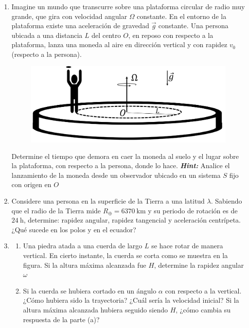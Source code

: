 \documentclass[letterpaper,11pt]{article}
\begin{document}
\begin{enumerate}
\item 
\begin{multicols}{2}
     Imagine un mundo que transcurre sobre una plataforma circular de radio muy grande, que gira con velocidad angular $\Omega$ constante. En el entorno de la plataforma existe una aceleración de gravedad $\vec{g}$ constante. Una persona ubicada a una distancia $L$ del centro $O$, en reposo con respecto a la plataforma, lanza una moneda al aire en dirección vertical y con rapidez $v_0$ (respecto a la persona). 
    \columnbreak
    
    \begin{figure}[H]
        \centering
        \includegraphics[width = 0.8\linewidth]{2021-1/Imagenes/aux4/moneda-circulo.pdf}
    \end{figure}
\end{multicols}

Determine el tiempo que demora en caer la moneda al suelo y el lugar sobre la plataforma, con respecto a la persona, donde lo hace.
\textbf{\textit{Hint:}} Analice el lanzamiento de la moneda desde un observador ubicado en un sistema $S$ fijo con origen en $O$

\item Considere una persona en la superficie de la Tierra a una latitud $\lambda$. Sabiendo que el radio de la Tierra mide $R_{\oplus}=\SI{6370}{\km}$ y su periodo de rotación es de $\SI{24}{\hour}$, determine: rapidez angular, rapidez tangencial y aceleración centrípeta. ¿Qué sucede en los polos y en el ecuador?

\item 
\begin{multicols}{2}
    \begin{enumerate}
    
        \item Una piedra atada a una cuerda de largo $L$ se hace rotar de manera vertical. En cierto instante, la cuerda se corta como se muestra en la figura. Si la altura máxima alcanzada fue $H$, determine la rapidez angular $\omega$
    
        
        \item Si la cuerda se hubiera cortado en un ángulo $\alpha$ con respecto a la vertical. ¿Cómo hubiera sido la trayectoria? ¿Cuál sería la velocidad inicial? Si la altura máxima alcanzada hubiera seguido siendo $H$, ¿cómo cambia su respuesta de la parte (a)?
    

\end{enumerate}
\end{multicols}
\end{enumerate}
\end{document}
